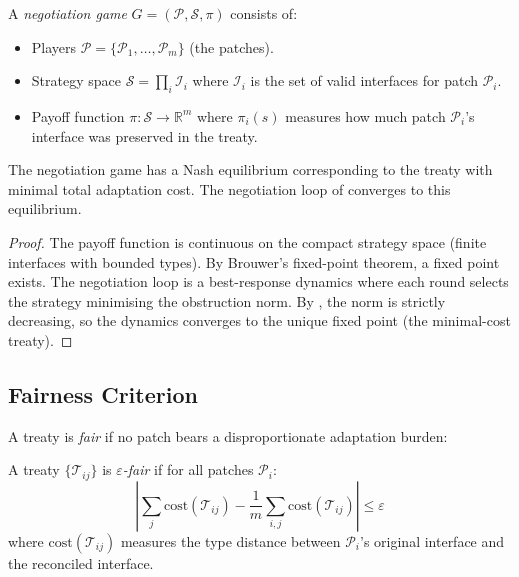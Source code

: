\documentclass[11pt]{article}
\newcommand{\treaty}{\mathcal{T}}
\newcommand{\patch}{\mathcal{P}}
\begin{document}
\begin{definition}\label{def:game}
A \emph{negotiation game} $G = (\mathcal{P}, \mathcal{S}, \pi)$
consists of:
\begin{itemize}[nosep]
\item Players $\mathcal{P} = \{\patch_1, \ldots, \patch_m\}$ (the patches).
\item Strategy space $\mathcal{S} = \prod_i \mathcal{I}_i$ where
  $\mathcal{I}_i$ is the set of valid interfaces for patch $\patch_i$.
\item Payoff function $\pi \colon \mathcal{S} \to \mathbb{R}^m$ where
  $\pi_i(s)$ measures how much patch $\patch_i$'s interface was
  preserved in the treaty.
\end{itemize}
\end{definition}

\begin{theorem}\label{thm:nash}
The negotiation game has a Nash equilibrium corresponding to the
treaty with minimal total adaptation cost.  The negotiation loop
of  converges to this equilibrium.
\end{theorem}

\begin{proof}
The payoff function is continuous on the compact strategy space
(finite interfaces with bounded types).  By Brouwer's fixed-point
theorem, a fixed point exists.  The negotiation loop is a
best-response dynamics where each round selects the strategy
minimising the obstruction norm.  By , the
norm is strictly decreasing, so the dynamics converges to the
unique fixed point (the minimal-cost treaty).
\end{proof}

\subsection{Fairness Criterion}

A treaty is \emph{fair} if no patch bears a disproportionate
adaptation burden:

\begin{definition}\label{def:fair}
A treaty $\{\treaty_{ij}\}$ is \emph{$\varepsilon$-fair} if for
all patches $\patch_i$:
\[
  \left| \sum_j \mathrm{cost}(\treaty_{ij}) -
  \frac{1}{m} \sum_{i,j} \mathrm{cost}(\treaty_{ij}) \right|
  \leq \varepsilon
\]
where $\mathrm{cost}(\treaty_{ij})$ measures the type distance
between $\patch_i$'s original interface and the reconciled interface.
\end{definition}
\end{document}
